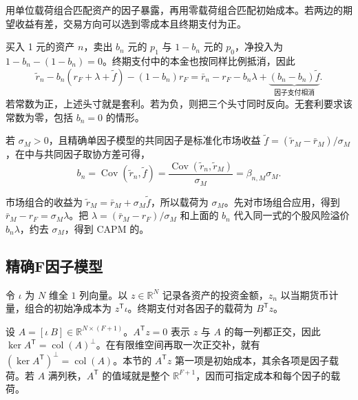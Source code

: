 用单位载荷组合匹配资产的因子暴露，再用零载荷组合匹配初始成本。若两边的期望收益有差，交易方向可以选到零成本且终期支付为正。

\begin{solution}[label-content={证明},blank-type=none]
买入 1 元的资产 $n$，卖出 $b_n$ 元的 $p_1$ 与 $1-b_n$ 元的 $p_0$，净投入为 $1-b_n-(1-b_n)=0$。终期支付中的本金也按同样比例抵消，因此
\[
 \widetilde r_n-b_n(r_F+\lambda+\widetilde f)-(1-b_n)r_F
 =\bar r_n-r_F-b_n\lambda
 +\underbrace{(b_n-b_n)\widetilde f}_{\text{因子支付相消}}.
\]
若常数为正，上述头寸就是套利。若为负，则把三个头寸同时反向。无套利要求该常数为零，包括 $b_n=0$ 的情形。
\end{solution}

若 $\sigma_M>0$，且精确单因子模型的共同因子是标准化市场收益 $\widetilde f=(\widetilde r_M-\bar r_M)/\sigma_M$，在中与共同因子取协方差可得，
\[
 b_n=\operatorname{Cov}(\widetilde r_n,\widetilde f)
 =\frac{\operatorname{Cov}(\widetilde r_n,\widetilde r_M)}{\sigma_M}
 =\beta_{n,M}\sigma_M.
\]

市场组合的收益为 $\widetilde r_M=\bar r_M+\sigma_M\widetilde f$，所以载荷为 $\sigma_M$。先对市场组合应用，得到 $\bar r_M-r_F=\sigma_M\lambda$。把 $\lambda=(\bar r_M-r_F)/\sigma_M$ 和上面的 $b_n$ 代入同一式的个股风险溢价 $b_n\lambda$，约去 $\sigma_M$，得到 CAPM 的。

\subsection{精确F因子模型}
令 $\iota$ 为 $N$ 维全 $1$ 列向量。以 $z\in\mathbb R^N$ 记录各资产的投资金额，$z_n$ 以当期货币计量，组合的初始净成本为 $z^{\mathsf T}\iota$。终期支付对各因子的载荷为 $B^{\mathsf T}z$。

\begin{tcolorbox}[knowledge,title={列空间与转置矩阵的零空间}]
设 $A=[\iota\ B]\in\mathbb R^{N\times(F+1)}$。$A^{\mathsf T}z=0$ 表示 $z$ 与 $A$ 的每一列都正交，因此 $\ker A^{\mathsf T}=\operatorname{col}(A)^\perp$。在有限维空间再取一次正交补，就有 $(\ker A^{\mathsf T})^\perp=\operatorname{col}(A)$。本节的 $A^{\mathsf T}z$ 第一项是初始成本，其余各项是因子载荷。若 $A$ 满列秩，$A^{\mathsf T}$ 的值域就是整个 $\mathbb R^{F+1}$，因而可指定成本和每个因子的载荷。
\end{tcolorbox}

